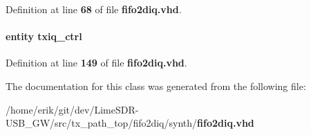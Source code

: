 Definition at line {\bf 68} of file {\bf fifo2diq.\+vhd}.

\paragraph[{txiq\+\_\+ctrl\+\_\+inst3}]{ {\bfseries \textcolor{keywordflow}{entity}\textcolor{vhdlchar}{ }\textcolor{vhdlchar}{txiq\+\_\+ctrl}\textcolor{vhdlchar}{ }} \hspace{0.3cm}{\ttfamily [Instantiation]}}\label{classfifo2diq_1_1arch_a9a94eeeef3c8d71e07e25028d3d2f986}


Definition at line {\bf 149} of file {\bf fifo2diq.\+vhd}.



The documentation for this class was generated from the following file\+:\begin{DoxyCompactItemize}
\item 
/home/erik/git/dev/\+Lime\+S\+D\+R-\/\+U\+S\+B\+\_\+\+G\+W/src/tx\+\_\+path\+\_\+top/fifo2diq/synth/{\bf fifo2diq.\+vhd}\end{DoxyCompactItemize}
